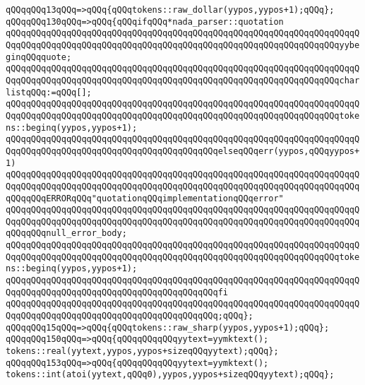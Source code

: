 \verb|qQQqqQQq13qQQq=>qQQq{qQQqtokens::raw_dollar(yypos,yypos+1);qQQq};|\newline
\verb|qQQqqQQq130qQQq=>qQQq{qQQqifqQQq*nada_parser::quotation|\newline
\verb|qQQqqQQqqQQqqQQqqQQqqQQqqQQqqQQqqQQqqQQqqQQqqQQqqQQqqQQqqQQqqQQqqQQqqQQqqQQqqQQqqQQqqQQqqQQqqQQqqQQqqQQqqQQqqQQqqQQqqQQqqQQqqQQqqQQqqQQqyybeginqQQqquote;|\newline
\verb|qQQqqQQqqQQqqQQqqQQqqQQqqQQqqQQqqQQqqQQqqQQqqQQqqQQqqQQqqQQqqQQqqQQqqQQqqQQqqQQqqQQqqQQqqQQqqQQqqQQqqQQqqQQqqQQqqQQqqQQqqQQqqQQqqQQqqQQqcharlistqQQq:=qQQq[];|\newline
\verb|qQQqqQQqqQQqqQQqqQQqqQQqqQQqqQQqqQQqqQQqqQQqqQQqqQQqqQQqqQQqqQQqqQQqqQQqqQQqqQQqqQQqqQQqqQQqqQQqqQQqqQQqqQQqqQQqqQQqqQQqqQQqqQQqqQQqqQQqtokens::beginq(yypos,yypos+1);|\newline
\verb|qQQqqQQqqQQqqQQqqQQqqQQqqQQqqQQqqQQqqQQqqQQqqQQqqQQqqQQqqQQqqQQqqQQqqQQqqQQqqQQqqQQqqQQqqQQqqQQqqQQqqQQqqQQqqQQqelseqQQqerr(yypos,qQQqyypos+1)|\newline
\verb|qQQqqQQqqQQqqQQqqQQqqQQqqQQqqQQqqQQqqQQqqQQqqQQqqQQqqQQqqQQqqQQqqQQqqQQqqQQqqQQqqQQqqQQqqQQqqQQqqQQqqQQqqQQqqQQqqQQqqQQqqQQqqQQqqQQqqQQqqQQqqQQqqQQqERRORqQQq"quotationqQQqimplementationqQQqerror"|\newline
\verb|qQQqqQQqqQQqqQQqqQQqqQQqqQQqqQQqqQQqqQQqqQQqqQQqqQQqqQQqqQQqqQQqqQQqqQQqqQQqqQQqqQQqqQQqqQQqqQQqqQQqqQQqqQQqqQQqqQQqqQQqqQQqqQQqqQQqqQQqqQQqqQQqqQQqnull_error_body;|\newline
\verb|qQQqqQQqqQQqqQQqqQQqqQQqqQQqqQQqqQQqqQQqqQQqqQQqqQQqqQQqqQQqqQQqqQQqqQQqqQQqqQQqqQQqqQQqqQQqqQQqqQQqqQQqqQQqqQQqqQQqqQQqqQQqqQQqqQQqqQQqtokens::beginq(yypos,yypos+1);|\newline
\verb|qQQqqQQqqQQqqQQqqQQqqQQqqQQqqQQqqQQqqQQqqQQqqQQqqQQqqQQqqQQqqQQqqQQqqQQqqQQqqQQqqQQqqQQqqQQqqQQqqQQqqQQqqQQqqQQqfi|\newline
\verb|qQQqqQQqqQQqqQQqqQQqqQQqqQQqqQQqqQQqqQQqqQQqqQQqqQQqqQQqqQQqqQQqqQQqqQQqqQQqqQQqqQQqqQQqqQQqqQQqqQQqqQQqqQQqqQQq;qQQq};|\newline
\verb|qQQqqQQq15qQQq=>qQQq{qQQqtokens::raw_sharp(yypos,yypos+1);qQQq};|\newline
\verb|qQQqqQQq150qQQq=>qQQq{qQQqqQQqqQQqyytext=yymktext();|\newline
\verb|tokens::real(yytext,yypos,yypos+sizeqQQqyytext);qQQq};|\newline
\verb|qQQqqQQq153qQQq=>qQQq{qQQqqQQqqQQqyytext=yymktext();|\newline
\verb|tokens::int(atoi(yytext,qQQq0),yypos,yypos+sizeqQQqyytext);qQQq};|\newline
